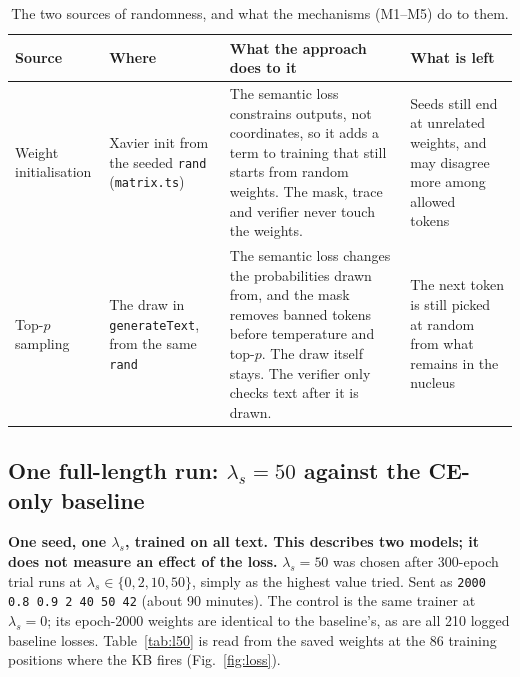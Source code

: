 \documentclass[letterpaper, 10pt, conference]{IEEEtran}
\begin{document}
\begin{table}[t]
\caption{The two sources of randomness, and what the mechanisms (M1--M5) do to them.}\label{tab:rand}
\centering\footnotesize\setlength{\tabcolsep}{4pt}
\begin{tabular}{@{}L{2.2cm}L{3.4cm}L{6.6cm}L{4.6cm}@{}}
\toprule
Source & Where & What the approach does to it & What is left\\
\midrule
Weight initialisation & Xavier init from the seeded \texttt{rand} (\texttt{matrix.ts}) & The semantic loss constrains outputs, not coordinates, so it adds a term to training that still starts from random weights. The mask, trace and verifier never touch the weights. & Seeds still end at unrelated weights, and may disagree more among allowed tokens~\cite{zombori}\\
Top-$p$ sampling & The draw in \texttt{generateText}, from the same \texttt{rand} & The semantic loss changes the probabilities drawn from, and the mask removes banned tokens before temperature and top-$p$. The draw itself stays. The verifier only checks text after it is drawn. & The next token is still picked at random from what remains in the nucleus\\
\bottomrule
\end{tabular}
\end{table}

\subsection{One full-length run: $\lambda_s{=}50$ against the CE-only baseline}
\textbf{One seed, one $\lambda_s$, trained on all text. This describes two models; it does not measure an effect of the loss.} $\lambda_s{=}50$ was chosen after 300-epoch trial runs at $\lambda_s\in\{0,2,10,50\}$, simply as the highest value tried. Sent as \texttt{2000 0.8 0.9 2 40 50 42} (about 90 minutes). The control is the same trainer at $\lambda_s{=}0$; its epoch-2000 weights are identical to the baseline's, as are all 210 logged baseline losses. Table~\ref{tab:l50} is read from the saved weights at the 86 training positions where the KB fires (Fig.~\ref{fig:loss}).
\end{document}
